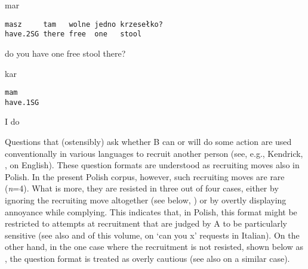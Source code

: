 \documentclass[output=paper]{langsci/langscibook}
\begin{document}
\vspace{2mm}
%
%
\begin{mdframednoverticalspace}[style=firstfoc]
\begin{transbox}{2}{mar}
\begin{verbatim}
masz     tam   wolne jedno krzesełko?
have.2SG there free  one   stool
\end{verbatim}
do you have one free stool there?
\end{transbox}
\end{mdframednoverticalspace}
%
\begin{mdframednoverticalspace}[style=secondfoc]
\begin{transbox}{3}{kar}
\begin{verbatim}
mam
have.1SG
\end{verbatim}
I do
\end{transbox}
\end{mdframednoverticalspace}
%

Questions that (ostensibly) ask whether B can or will do some action are used conventionally in various languages to recruit another person (see, e.g., Kendrick, ,  on English).  These question formats are understood as recruiting moves also in Polish.  In the present Polish corpus, however, such recruiting moves are rare (\textit{n}=4). What is more, they are resisted in three out of four cases, either by ignoring the recruiting move altogether (see below, ) or by overtly displaying annoyance while complying.  This indicates that, in Polish, this format might be restricted to attempts at recruitment that are judged by A to be particularly sensitive (see also \citealt[chap. 4]{Rossi2015a} and  of this volume,  on ‘can you x’ requests in Italian).  On the other hand, in the one case where the recruitment is not resisted, shown below as , the question format is treated as overly cautious (see also \citealt{ZinkenOgiermann2013} on a similar case).  
\end{document}
